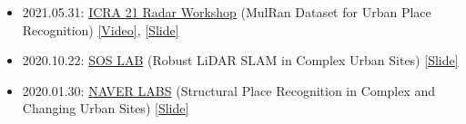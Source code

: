 \begin{itemize}[label=$\cdot$]
    \item 2021.05.31: \href{https://sites.google.com/view/radar-robotics/home}{ICRA 21 Radar Workshop} (MulRan Dataset for Urban Place Recognition) \href{https://www.youtube.com/watch?v=jFvKW9Kj8Ts}{[Video]}, \href{https://www.dropbox.com/s/dknylah6b7rizr8/20210531\%20icra\%20ws\%20mulran\%20v3.pptx?dl=0}{[Slide]}
    
    \item 2020.10.22: \href{http://soslab.co/}{SOS LAB} (Robust LiDAR SLAM in Complex Urban Sites) \href{https://www.dropbox.com/s/p30dpjqjbjhq69x/20201022\%20SOSLAB\%20talk\%20Giseop\%20Kim\%20share.pdf?dl=0}{[Slide]}
    
    \item 2020.01.30: \href{https://www.naverlabs.com/}{NAVER LABS} (Structural Place Recognition in Complex and Changing Urban Sites) \href{https://www.google.com/url?q=https\%3A\%2F\%2Fwww.dropbox.com\%2Fs\%2Fcoul2elzlulbj1j\%2FStructural\%2520Place\%2520Recognition\%2520in\%2520Complex\%2520and\%2520Changing\%2520Urban\%2520Sites.pptx\%3Fdl\%3D0&sa=D&sntz=1&usg=AFQjCNF6McgylrY6kU5KmqvCLC6_n-TzIw}{[Slide]}
\end{itemize}

